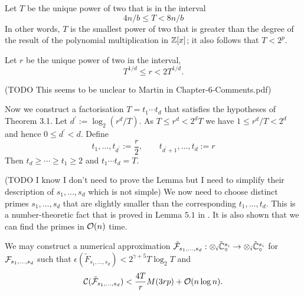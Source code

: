 



Let $T$ be the unique power of two that is in the interval
\begin{equation}
    4n/b \leq T < 8n/b
\end{equation}
In other words, $T$ is the smallest power of two that is greater than the degree of the result of the polynomial multiplication in ${\mathbb Z}[x]$; it also follows that $T < 2^p$.

Let $r$ be the unique power of two in the interval,
\[
    T^{1/d} \leq r < 2T^{1/d}.
\]

(TODO This seems to be unclear to Martin in Chapter-6-Comments.pdf)

Now we construct a factorisation $T = t_1 \cdots t_d$ that satisfies the hypotheses of Theorem 3.1. Let $d^\prime := \log_2(r^d / T)$. As $T \leq r^d < 2^d T$ we have $1 \leq r^d / T < 2^d$ and hence $0 \leq d^\prime < d$. Define
\[
    t_1, \ldots, t_{d^\prime} := \frac{r}{2}, \qquad t_{d^\prime + 1} , \ldots, t_d := r
\]
Then $t_d \geq \cdots \geq t_1 \geq 2$ and $t_1\cdots t_d = T$.

\medskip

(TODO I know I don't need to prove the Lemma but I need to simplify their description of $s_1, \ldots, s_d$ which is not simple)
\medskip
We now need to choose distinct primes $s_1, \ldots, s_d$ that are slightly smaller than the corresponding $t_1, \ldots, t_d$. This is a number-theoretic fact that is proved in Lemma $5.1$ in \cite{nlogn}. It is also shown that we can find the primes in $\mathcal O(n)$ time.

\begin{proposition}
    We may construct a numerical approximation $\tilde{\mathcal F}_{s_1, \ldots, s_d}: \otimes_i \tilde{{\mathbb C}}_\circ^{s_i} \to \otimes_i \tilde{{\mathbb C}}_\circ^{s_i}$ for $\mathcal F_{s_1, \ldots, s_d}$ such that $\epsilon(\tilde{F}_{s_1, \ldots, s_d}) < 2^{\gamma + 5} T \log_2 T$ and
    \[
        \mathcal C(\tilde{\mathcal F}_{s_1, \ldots, s_d}) < \frac{4T}{r} M(3rp) + \mathcal O(n \log n).
    \]
\end{proposition}

